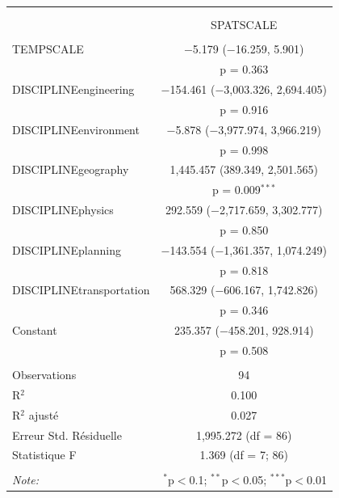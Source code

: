 \begin{table}%
\begin{tabular}{@{\extracolsep{5pt}}lc} 
\\[-1.8ex]\hline 
\hline \\[-1.8ex] 
\\[-1.8ex] & SPATSCALE \\ 
\hline \\[-1.8ex] 
 TEMPSCALE & $-$5.179 ($-$16.259, 5.901) \\ 
  & p = 0.363 \\ 
  DISCIPLINEengineering & $-$154.461 ($-$3,003.326, 2,694.405) \\ 
  & p = 0.916 \\ 
  DISCIPLINEenvironment & $-$5.878 ($-$3,977.974, 3,966.219) \\ 
  & p = 0.998 \\ 
  DISCIPLINEgeography & 1,445.457 (389.349, 2,501.565) \\ 
  & p = 0.009$^{***}$ \\ 
  DISCIPLINEphysics & 292.559 ($-$2,717.659, 3,302.777) \\ 
  & p = 0.850 \\ 
  DISCIPLINEplanning & $-$143.554 ($-$1,361.357, 1,074.249) \\ 
  & p = 0.818 \\ 
  DISCIPLINEtransportation & 568.329 ($-$606.167, 1,742.826) \\ 
  & p = 0.346 \\ 
  Constant & 235.357 ($-$458.201, 928.914) \\ 
  & p = 0.508 \\ 
 \hline \\[-1.8ex] 
Observations & 94 \\ 
R$^{2}$ & 0.100 \\ 
R$^{2}$ ajusté & 0.027 \\ 
Erreur Std. Résiduelle & 1,995.272 (df = 86) \\ 
Statistique F & 1.369 (df = 7; 86) \\ 
\hline 
\hline \\[-1.8ex] 
\textit{Note:}  & \multicolumn{1}{r}{$^{*}$p$<$0.1; $^{**}$p$<$0.05; $^{***}$p$<$0.01} \\ 
\end{tabular} 
\end{table} 






